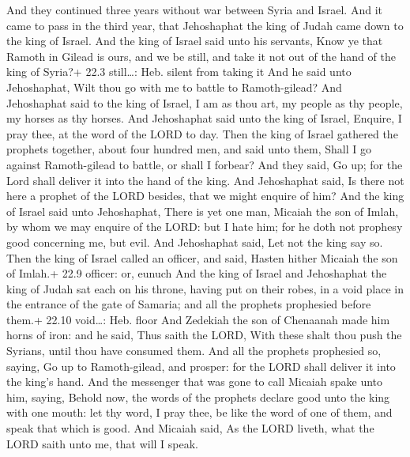  And they continued three years without war between Syria
and Israel.  And it came to pass in the third year, that
Jehoshaphat the king of Judah came down to the king of Israel.
 And the king of Israel said unto his servants, Know ye that
Ramoth in Gilead is ours, and we be still, and take it not out of the
hand of the king of Syria?+ 22.3 still\ldots: Heb. silent from taking it
 And he said unto Jehoshaphat, Wilt thou go with me to
battle to Ramoth-gilead? And Jehoshaphat said to the king of Israel, I
am as thou art, my people as thy people, my horses as thy horses.
 And Jehoshaphat said unto the king of Israel, Enquire, I
pray thee, at the word of the LORD to day.  Then the king of
Israel gathered the prophets together, about four hundred men, and said
unto them, Shall I go against Ramoth-gilead to battle, or shall I
forbear? And they said, Go up; for the Lord shall deliver it into the
hand of the king.  And Jehoshaphat said, Is there not here a
prophet of the LORD besides, that we might enquire of him? 
And the king of Israel said unto Jehoshaphat, There is yet one man,
Micaiah the son of Imlah, by whom we may enquire of the LORD: but I hate
him; for he doth not prophesy good concerning me, but evil. And
Jehoshaphat said, Let not the king say so.  Then the king of
Israel called an officer, and said, Hasten hither Micaiah the son of
Imlah.+ 22.9 officer: or, eunuch  And the king of Israel
and Jehoshaphat the king of Judah sat each on his throne, having put on
their robes, in a void place in the entrance of the gate of Samaria; and
all the prophets prophesied before them.+ 22.10 void\ldots: Heb. floor
 And Zedekiah the son of Chenaanah made him horns of iron:
and he said, Thus saith the LORD, With these shalt thou push the
Syrians, until thou have consumed them.  And all the
prophets prophesied so, saying, Go up to Ramoth-gilead, and prosper: for
the LORD shall deliver it into the king's hand.  And the
messenger that was gone to call Micaiah spake unto him, saying, Behold
now, the words of the prophets declare good unto the king with one
mouth: let thy word, I pray thee, be like the word of one of them, and
speak that which is good.  And Micaiah said, As the LORD
liveth, what the LORD saith unto me, that will I speak.

